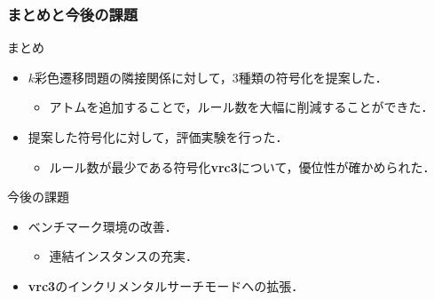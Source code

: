 \documentclass[dvipdfmx,11pt]{beamer}
\begin{document}

\begin{frame}\frametitle{まとめと今後の課題}

  \begin{block}{まとめ}
    \begin{itemize}
      \item $k$彩色遷移問題の隣接関係に対して，3種類の符号化を提案した．
      \begin{itemize}
        \item アトムを追加することで，ルール数を大幅に削減することができた．
      \end{itemize}
      \item 提案した符号化に対して，評価実験を行った．
      \begin{itemize}
        \item ルール数が最少である符号化\textbf{vrc3}について，優位性が確かめられた．
      \end{itemize}
    \end{itemize}
  \end{block}
  
  \begin{alertblock}{今後の課題}
    \begin{itemize}
      \item ベンチマーク環境の改善．
      \begin{itemize}
        \item 連結インスタンスの充実．
      \end{itemize}
      \item \textbf{vrc3}の\alert{インクリメンタルサーチモード}への拡張．
    \end{itemize}
  \end{alertblock}

\end{frame}



\end{document}
